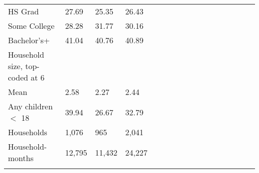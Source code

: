 \begin{center}
\begin{tabularx} {14cm} {@{} l Y Y Y Y Y Y Y Y Y Y Y Y Y Y Y Y@{}}
HS Grad&27.69&25.35&26.43 \\
Some College&28.28&31.77&30.16 \\
Bachelor's+&41.04&40.76&40.89 \\
\midrule
Household size, top-coded at 6&&& \\ 
 Mean & 2.58 & 2.27 & 2.44 \\
Any children $<$ 18 &39.94&26.67&32.79 \\
\midrule
Households & 1,076 & 965 & 2,041 \\
 Household-months & 12,795&11,432&24,227 \\
\bottomrule
\addlinespace[.75ex]
\end{tabularx}
\par
\scriptsize{}
\normalsize
\end{center}
